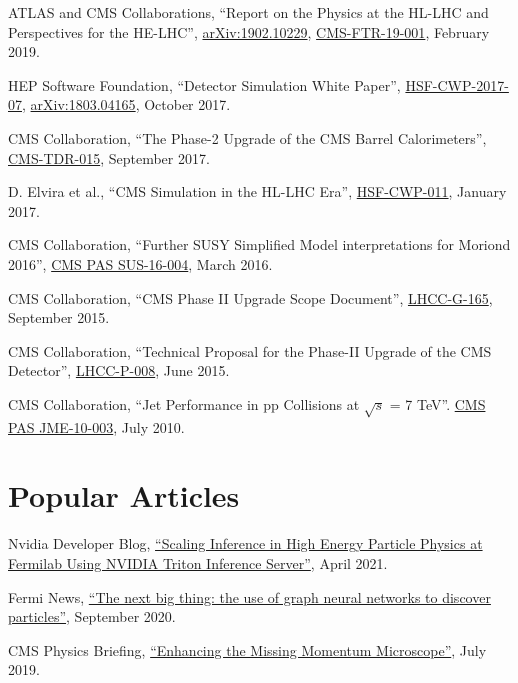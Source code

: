 \begin{description}[leftmargin=12pt,font=\normalfont,labelsep=0em]
\item \begin{sloppypar}ATLAS and CMS Collaborations, ``Report on the Physics at the HL-LHC and Perspectives for the HE-LHC'', \href{http://arxiv.org/abs/arXiv:1902.10229}{arXiv:1902.10229}, \href{https://cds.cern.ch/record/2651134}{CMS-FTR-19-001}, February 2019.\end{sloppypar}
\item HEP Software Foundation, ``Detector Simulation White Paper'', \href{http://hepsoftwarefoundation.org/activities/cwp.html}{HSF-CWP-2017-07}, \href{https://arxiv.org/abs/1803.04165}{arXiv:1803.04165}, October 2017.
\item CMS Collaboration, ``The Phase-2 Upgrade of the CMS Barrel Calorimeters'', \href{https://cds.cern.ch/record/2283187}{CMS-TDR-015}, September 2017.
\item D. Elvira et al., ``CMS Simulation in the HL-LHC Era'', \href{http://hepsoftwarefoundation.org/cwp-whitepapers.html}{HSF-CWP-011}, January 2017.
\item CMS Collaboration, ``Further SUSY Simplified Model interpretations for Moriond 2016'', \href{http://cds.cern.ch/record/2140312}{CMS PAS SUS-16-004}, March 2016.
\item CMS Collaboration, ``CMS Phase II Upgrade Scope Document'', \href{https://cds.cern.ch/record/2055167}{LHCC-G-165}, September 2015.
\item CMS Collaboration, ``Technical Proposal for the Phase-II Upgrade of the CMS Detector'', \href{http://cds.cern.ch/record/2020886}{LHCC-P-008}, June 2015.
\item CMS Collaboration, ``Jet Performance in pp Collisions at $\sqrt{s}$ = 7 TeV''. \href{http://cds.cern.ch/record/1279362}{CMS PAS JME-10-003}, July 2010.
\end{description}

\section{Popular Articles}
\begin{description}[leftmargin=12pt,font=\normalfont,labelsep=0em]
\item Nvidia Developer Blog, \href{https://developer.nvidia.com/blog/scaling-inference-in-high-energy-particle-physics-at-fermilab-using-nvidia-triton-inference-server/}{``Scaling Inference in High Energy Particle Physics at Fermilab Using NVIDIA Triton Inference Server''}, April 2021.
\item Fermi News, \href{https://news.fnal.gov/2020/09/the-next-big-thing-the-use-of-graph-neural-networks-to-discover-particles/}{``The next big thing: the use of graph neural networks to discover particles''}, September 2020.
\item CMS Physics Briefing, \href{https://cms.cern/news/enhancing-missing-momentum-microscope}{``Enhancing the Missing Momentum Microscope''}, July 2019.
\end{description}

